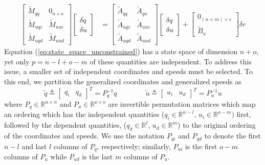\begin{align}
  \label{eq:state_space_unconstrained}
  \left[
    \begin{array}{cc}
      \tilde{M}_{qq} & 0_{n \times o} \\
      \tilde{M}_{uqc} & \tilde{M}_{uuc} \\
      \tilde{M}_{uqd} & \tilde{M}_{uud}
    \end{array}
    \right]
    \left[
      \begin{array}{c}
        \delta \dot{q} \\
        \delta \dot{u}
      \end{array}
    \right]
   &=
   \left[
     \begin{array}{cc}
       \tilde{A}_{qq} & \tilde{A}_{qu} \\
       \tilde{A}_{uqc} & \tilde{A}_{uuc} \\
       \tilde{A}_{uqd} & \tilde{A}_{uud}
     \end{array}
   \right]
    \left[
      \begin{array}{c}
        \delta q \\
        \delta u
      \end{array}
    \right]
    +
    \left[
      \begin{array}{c}
        0_{(n + m) \times s} \\
        \tilde{B}_{u}
      \end{array}
    \right]
    \delta r
\end{align}
Equation (\ref{eq:state_space_unconstrained}) has a state space of dimension $n
+ o$, yet only $p = n - l + o - m$ of these quantities are independent.  To
address this issue, a smaller set of independent coordinates and speeds must be
selected. To this end, we partition the generalized coordinates and generalized
speeds as
\begin{equation*}
  \tilde{q} \triangleq \left[\begin{array}{cc}q_{i} &
      q_{d}\end{array}\right]^{T} =  P_{q}^{-1} q
      \qquad\qquad
  \tilde{u} \triangleq \left[\begin{array}{cc}u_{i} &
      u_{d}\end{array}\right]^{T} =  P_{u}^{-1} u
\end{equation*}
where $P_q \in \mathbb{R}^{n \times n}$ and $P_u \in \mathbb{R}^{o \times o}$
are invertible permutation matrices which map an ordering which has the
independent quantities ($q_{i}\in\mathbb{R}^{n-l},\,
u_{i}\in\mathbb{R}^{o-m})$ first, followed by the dependent quantities,
($q_{d}\in\mathbb{R}^{l},\, u_{d}\in\mathbb{R}^{m}$) to the original
ordering of the coordinates and speeds.  We use the notation $P_{qi}$ and
$P_{qd}$ to denote the first $n-l$ and last $l$ columns of $P_q$, respectively;
similarly, $P_{ui}$ is the first $o-m$ columns of $P_{u}$ while $P_{ud}$ is the
last $m$ columns of $P_u$.

